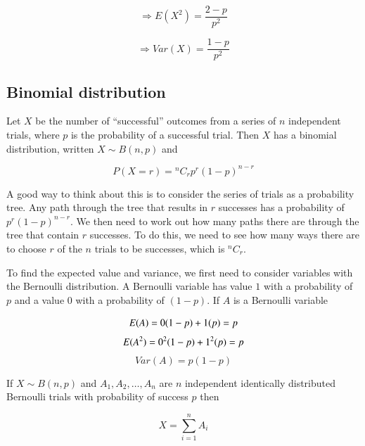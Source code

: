 \documentclass[a5paper]{article}
\begin{document}
\begin{equation}
  \Rightarrow E(X^2) = \frac{2 - p}{p^2}
\end{equation}

\begin{equation}
  \Rightarrow Var(X) = \frac{1 - p}{p^2}
\end{equation}

\subsection{Binomial distribution}

Let $X$ be the number of ``successful'' outcomes from a series of $n$
independent trials, where $p$ is the probability of a successful trial. Then $X$
has a binomial distribution, written $X \sim B(n,p)$ and

\begin{equation}
  P(X\!=\!r) = {}^nC_rp^r(1-p)^{n-r}
\end{equation}

A good way to think about this is to consider the series of trials as a
probability tree. Any path through the tree that results in $r$ successes has a
probability of $p^r(1-p)^{n-r}$. We then need to work out how many paths there
are through the tree that contain $r$ successes. To do this, we need to see how
many ways there are to choose $r$ of the $n$ trials to be successes, which is
${}^nC_r$.

To find the expected value and variance, we first need to consider variables
with the Bernoulli distribution. A Bernoulli variable has value $1$ with a
probability of $p$ and a value $0$ with a probability of $(1-p)$. If $A$ is a
Bernoulli variable


\begin{equation}
  E(A) = 0(1-p) + 1(p) = p \\
\end{equation}
\begin{equation}
  E(A^2) = 0^2(1-p) + 1^2(p) = p \\
\end{equation}
\begin{equation}
  Var(A) = p(1-p)
\end{equation}

If $X\sim B(n,p)$ and $A_1, A_2, \ldots, A_n$ are $n$ independent identically
distributed Bernoulli trials with probability of success $p$ then

\begin{equation}
  X = \sum_{i=1}^n A_i
\end{equation}
\end{document}
